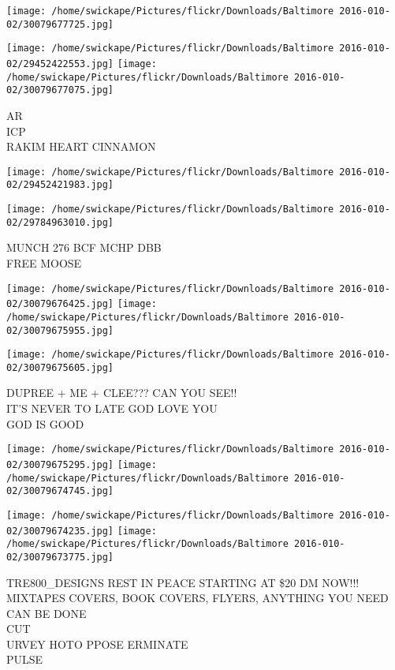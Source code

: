 \documentclass[10pt,letterpaper]{article}
\begin{document}
\texttt{[image: /home/swickape/Pictures/flickr/Downloads/Baltimore 2016-010-02/30079677725.jpg]}

\vspace{0.25in}
\texttt{[image: /home/swickape/Pictures/flickr/Downloads/Baltimore 2016-010-02/29452422553.jpg]}
\texttt{[image: /home/swickape/Pictures/flickr/Downloads/Baltimore 2016-010-02/30079677075.jpg]}

AR\\
ICP\\
RAKIM HEART CINNAMON
\pagebreak

\texttt{[image: /home/swickape/Pictures/flickr/Downloads/Baltimore 2016-010-02/29452421983.jpg]}

\vspace{0.25in}
\texttt{[image: /home/swickape/Pictures/flickr/Downloads/Baltimore 2016-010-02/29784963010.jpg]}

MUNCH 276 BCF MCHP DBB\\
FREE MOOSE
\pagebreak

\texttt{[image: /home/swickape/Pictures/flickr/Downloads/Baltimore 2016-010-02/30079676425.jpg]}
\texttt{[image: /home/swickape/Pictures/flickr/Downloads/Baltimore 2016-010-02/30079675955.jpg]}

\vspace{0.25in}
\texttt{[image: /home/swickape/Pictures/flickr/Downloads/Baltimore 2016-010-02/30079675605.jpg]}

DUPREE + ME + CLEE??? CAN YOU SEE!!\\
IT'S NEVER TO LATE GOD LOVE YOU\\
GOD IS GOOD
\pagebreak

\texttt{[image: /home/swickape/Pictures/flickr/Downloads/Baltimore 2016-010-02/30079675295.jpg]}
\texttt{[image: /home/swickape/Pictures/flickr/Downloads/Baltimore 2016-010-02/30079674745.jpg]}

\texttt{[image: /home/swickape/Pictures/flickr/Downloads/Baltimore 2016-010-02/30079674235.jpg]}
\texttt{[image: /home/swickape/Pictures/flickr/Downloads/Baltimore 2016-010-02/30079673775.jpg]}

TRE800\_DESIGNS REST IN PEACE STARTING AT \$20 DM NOW!!! MIXTAPES COVERS, BOOK COVERS, FLYERS, ANYTHING YOU NEED CAN BE DONE\\
CUT\\
URVEY HOTO PPOSE ERMINATE\\
PULSE
\pagebreak
\end{document}
